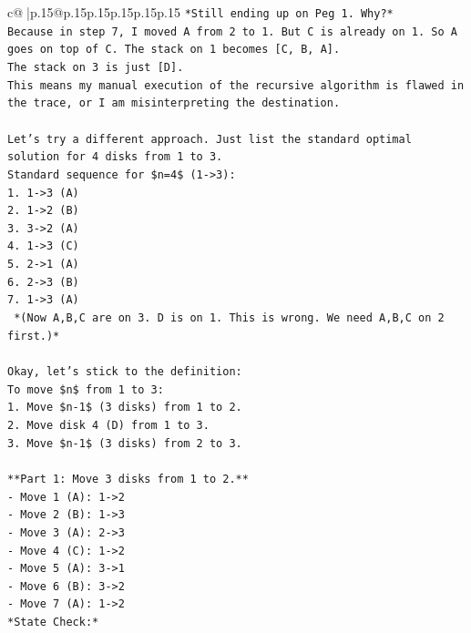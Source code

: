 \documentclass{article}
\begin{document}
{\begin{supertabular}{c@{$\;$}|p{.15\linewidth}@{}p{.15\linewidth}p{.15\linewidth}p{.15\linewidth}p{.15\linewidth}p{.15\linewidth}}
{{{\texttt{*Still ending up on Peg 1. Why?*} \\
\texttt{Because in step 7, I moved A from 2 to 1. But C is already on 1. So A goes on top of C. The stack on 1 becomes {[}C, B, A{]}.} \\
\texttt{The stack on 3 is just {[}D{]}.} \\
\texttt{This means my manual execution of the recursive algorithm is flawed in the trace, or I am misinterpreting the destination.} \\
\\ 
\texttt{Let's try a different approach. Just list the standard optimal solution for 4 disks from 1 to 3.} \\
\texttt{Standard sequence for \$n=4\$ (1{-}>3):} \\
\texttt{1. 1{-}>3 (A)} \\
\texttt{2. 1{-}>2 (B)} \\
\texttt{3. 3{-}>2 (A)} \\
\texttt{4. 1{-}>3 (C)} \\
\texttt{5. 2{-}>1 (A)} \\
\texttt{6. 2{-}>3 (B)} \\
\texttt{7. 1{-}>3 (A)} \\
\texttt{   *(Now A,B,C are on 3. D is on 1. This is wrong. We need A,B,C on 2 first.)*} \\
\\ 
\texttt{Okay, let's stick to the definition:} \\
\texttt{To move \$n\$ from 1 to 3:} \\
\texttt{1. Move \$n{-}1\$ (3 disks) from 1 to 2.} \\
\texttt{2. Move disk 4 (D) from 1 to 3.} \\
\texttt{3. Move \$n{-}1\$ (3 disks) from 2 to 3.} \\
\\ 
\texttt{**Part 1: Move 3 disks from 1 to 2.**} \\
\texttt{{-} Move 1 (A): 1{-}>2} \\
\texttt{{-} Move 2 (B): 1{-}>3} \\
\texttt{{-} Move 3 (A): 2{-}>3} \\
\texttt{{-} Move 4 (C): 1{-}>2} \\
\texttt{{-} Move 5 (A): 3{-}>1} \\
\texttt{{-} Move 6 (B): 3{-}>2} \\
\texttt{{-} Move 7 (A): 1{-}>2} \\
\texttt{*State Check:*} \\
}}}
\end{supertabular}}
\end{document}
